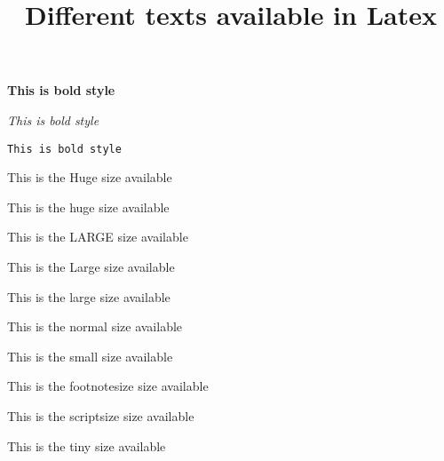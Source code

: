 \documentclass{article}
\title{Different texts available in Latex}
\author{}
\date{}
\begin{document}
\maketitle	
\textbf{This is bold style}

\textit{This is bold style}

\texttt{This is bold style}

\Huge{This is the Huge size available}

\huge{This is the huge size available}

\LARGE{This is the LARGE size available}

\Large{This is the Large size available}

\large{This is the large size available}

\normalsize{This is the normal size available}

\small{This is the small size available}

\footnotesize{This is the footnotesize size available}

\scriptsize{This is the scriptsize size available}

\tiny{This is the tiny size available}
	
	
	
\end{document}
